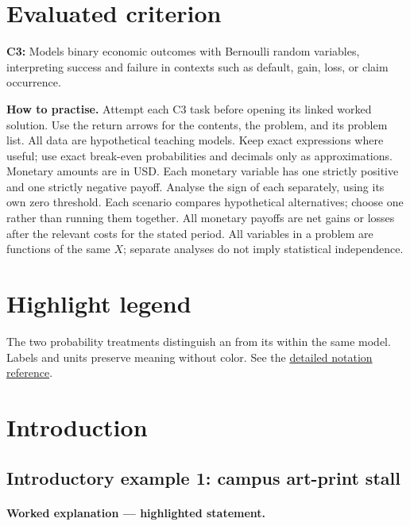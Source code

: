 \section*{Evaluated criterion}
\textbf{C3:} Models binary economic outcomes with Bernoulli random variables, interpreting success and failure in contexts such as default, gain, loss, or claim occurrence.

\textbf{How to practise.} Attempt each C3 task before opening its linked worked solution.
Use the return arrows for the contents, the problem, and its problem list.
All data are hypothetical teaching models. Keep exact expressions where useful;
use exact break-even probabilities and decimals only as approximations. Monetary amounts are in USD.
Each monetary variable has one strictly positive and one strictly negative payoff.
Analyse the sign of each  separately, using its own zero threshold.
Each scenario compares hypothetical alternatives; choose one rather than running them together.
All monetary payoffs are net gains or losses after the relevant costs for the stated period.
All variables in a problem are functions of the same $X$; separate analyses do
not imply statistical independence.


\clearpage\section*{Highlight legend}
\label{tab:highlight-legend}

The two probability treatments distinguish an  from its  within
the same model. Labels and units preserve meaning without color.
See the \hyperref[tab:notation-reference]{detailed notation reference}.

\clearpage\section{Introduction}\label{sec:t2-c3-introduction}
\subsection{Introductory example 1: campus art-print stall}\label{ex:intro-one}
\CThreePlain{\CThreeStatementIntroOne}
\CThreePlain{\CThreeIntroTaskOne}
\CThreePlain{\CThreeIntroTaskTwo}

\paragraph{Worked explanation --- highlighted statement.}
\CThreeStatementIntroOne
\CThreeIntroTaskOne
